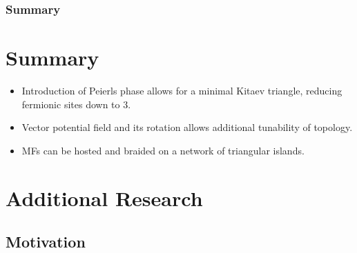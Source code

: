 \documentclass[xcolor=dvipsnames,10pt,aspectratio=169]{beamer}
\newcommand{\MO}{Motivation}
\newcommand{\CO}{Summary}
\begin{document}
  \begin{frame}
    \frametitle{Summary}

  \section{\CO}
    \begin{itemize}
      \item Introduction of Peierls phase allows for a minimal Kitaev triangle, reducing fermionic sites down to 3.
      \item Vector potential field and its rotation allows additional tunability of topology.
      \item MFs can be hosted and braided on a network of triangular islands.
    \end{itemize}
  \end{frame}

  \section{Additional Research}

  \subsection{\MO}
\end{document}
